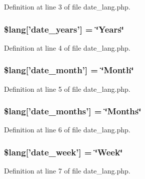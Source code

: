 Definition at line 3 of file date\-\_\-lang.\-php.

\subsubsection[{\$lang}]{\setlength{\rightskip}{0pt plus 5cm}\$lang['date\-\_\-years'] = \char`\"{}Years\char`\"{}}\label{date__lang_8php_ad553cabe66c6e6feff320f69fadfc561}


Definition at line 4 of file date\-\_\-lang.\-php.

\subsubsection[{\$lang}]{\setlength{\rightskip}{0pt plus 5cm}\$lang['date\-\_\-month'] = \char`\"{}Month\char`\"{}}\label{date__lang_8php_a27b6a453e0ff873f09050b0882b86b43}


Definition at line 5 of file date\-\_\-lang.\-php.

\subsubsection[{\$lang}]{\setlength{\rightskip}{0pt plus 5cm}\$lang['date\-\_\-months'] = \char`\"{}Months\char`\"{}}\label{date__lang_8php_af22d57f979004523c31e7252891b8ce1}


Definition at line 6 of file date\-\_\-lang.\-php.

\subsubsection[{\$lang}]{\setlength{\rightskip}{0pt plus 5cm}\$lang['date\-\_\-week'] = \char`\"{}Week\char`\"{}}\label{date__lang_8php_a027a67b9a8e626d4a9b4080f8100ca53}


Definition at line 7 of file date\-\_\-lang.\-php.

